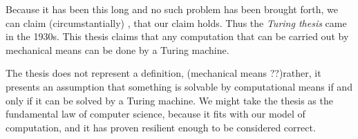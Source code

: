 \documentclass{article}
\begin{document}
Because it has been this long and no such problem has been brought forth, we can claim (circumstantially)
, that our claim holds. Thus the \textit{Turing thesis} came in the 1930s. This thesis claims that any 
computation that can be carried out by mechanical means can be done by a Turing machine.

The thesis does not represent a definition, (mechanical means ??)rather, it presents an assumption that
something is solvable by computational means if and only if it can be solved by a Turing machine. We might
take the thesis as the fundamental law of computer science, because it fits with our model of computation, 
and it has proven resilient enough to be considered correct. 
\end{document}
